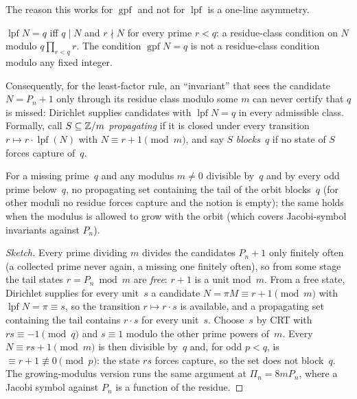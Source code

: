 \documentclass[10pt,a4paper]{article}
\newcommand{\lpf}{\operatorname{lpf}}
\newcommand{\gpf}{\operatorname{gpf}}
\begin{document}
The reason this works for $\gpf$ and not for $\lpf$ is a one-line
asymmetry.

\begin{proposition}
$\lpf N=q$ iff $q\mid N$ and $r\nmid N$ for every prime $r<q$: a
residue-class condition on $N$ modulo $q\prod_{r<q}r$.  The condition
$\gpf N=q$ is not a residue-class condition modulo any fixed integer.
\end{proposition}

Consequently, for the least-factor rule, an ``invariant'' that sees the
candidate $N=P_n+1$ only through its residue class modulo some $m$ can
never certify that $q$ is missed: Dirichlet supplies candidates with
$\lpf N=q$ in every admissible class.  Formally, call $S\subseteq\mathbb{Z}/m$
\emph{propagating} if it is closed under every transition
$r\mapsto r\cdot\lpf(N)$ with $N\equiv r+1\pmod m$, and say $S$
\emph{blocks}~$q$ if no state of $S$ forces capture of~$q$.

\begin{theorem}
For a missing prime~$q$ and any modulus $m\ne0$ divisible by~$q$ and by
every odd prime below~$q$, no propagating set
containing the tail of the orbit blocks~$q$ (for other moduli no residue
forces capture and the notion is empty); the same holds when the
modulus is allowed to grow with the orbit (which covers Jacobi-symbol
invariants against $P_n$).
\end{theorem}

\begin{proof}[Sketch]
Every prime dividing $m$ divides the candidates $P_n+1$ only finitely often
(a collected prime never again, a missing one finitely often), so from some
stage the tail states $r=P_n\bmod m$ are \emph{free}: $r+1$ is a unit
mod~$m$.  From a free state, Dirichlet supplies for every unit~$s$ a
candidate $N=\pi M\equiv r+1\pmod m$ with $\lpf N=\pi\equiv s$, so the
transition $r\mapsto r\cdot s$ is available, and a propagating set
containing the tail contains $r\cdot s$ for every unit~$s$.  Choose~$s$ by
CRT with $rs\equiv-1\pmod q$ and $s\equiv1$ modulo the other prime powers
of~$m$.  Every $N\equiv rs+1\pmod m$ is then divisible by~$q$ and, for odd
$p<q$, is $\equiv r+1\not\equiv0\pmod p$: the state $rs$ forces capture,
so the set does not block~$q$.  The growing-modulus version runs the same
argument at $\Pi_n=8mP_n$, where a Jacobi symbol against $P_n$ is a function
of the residue.
\end{proof}
\end{document}
